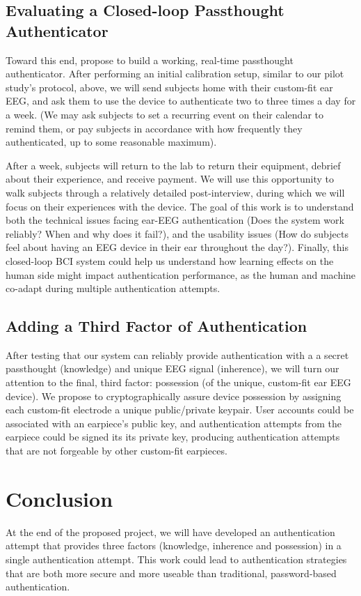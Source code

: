 \documentclass[11pt]{article}
\begin{document}
\subsection{Evaluating a Closed-loop Passthought Authenticator}
Toward this end, propose to build a working, real-time passthought authenticator.
After performing an initial calibration setup, similar to our pilot study's protocol, above,
we will send subjects home with their custom-fit ear EEG, and ask them to use the device to authenticate
two to three times a day for a week.
(We may ask subjects to set a recurring event on their calendar to remind them, 
or pay subjects in accordance with how frequently they authenticated, up to some reasonable maximum).

After a week, subjects will return to the lab to return their equipment, debrief about their experience, and receive payment. We will use this opportunity to walk subjects through a relatively detailed post-interview,
during which we will focus on their experiences with the device. 
The goal of this work is to understand both the technical issues facing ear-EEG authentication
(Does the system work reliably? When and why does it fail?), and the usability issues
(How do subjects feel about having an EEG device in their ear throughout the day?).
Finally, this closed-loop BCI system could help us understand how learning effects
on the human side might impact authentication performance, as the human and machine
co-adapt during multiple authentication attempts.

\subsection{Adding a Third Factor of Authentication}
After testing that our system can reliably provide authentication with a 
a secret passthought (knowledge) and unique EEG signal (inherence),
we will turn our attention to the final, third factor: possession
(of the unique, custom-fit ear EEG device).
We propose to cryptographically assure device possession
by assigning each custom-fit electrode a unique public/private keypair. 
User accounts could be associated with an earpiece's public key,
and authentication attempts from the earpiece could be signed its
its private key, producing authentication attempts that are not
forgeable by other custom-fit earpieces. 

\section{Conclusion}
At the end of the proposed project,
we will have developed an authentication attempt that provides three factors
(knowledge, inherence and possession) in a single authentication attempt.
This work could lead to authentication strategies that are both more secure
and more useable than traditional, password-based authentication.
\end{document}
